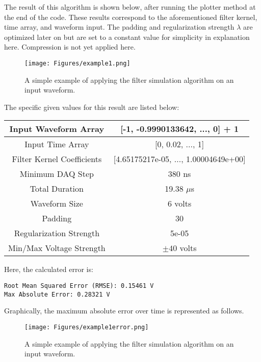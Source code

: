 \documentclass[11pt, a4paper]{article}
\theoremstyle{definition}
\numberwithin{equation}{section}
\begin{document}
The result of this algorithm is shown below, after running the plotter method at the end of the code. These results correspond to the aforementioned filter kernel, time array, and waveform input. The padding and regularization strength $\lambda$ are optimized later on but are set to a constant value for simplicity in explanation here. Compression is not yet applied here.

\begin{figure}[h!]
    \centering
\texttt{[image: Figures/example1.png]}
    \caption{A simple example of applying the filter simulation algorithm on an input waveform.}
\end{figure} \label{example1}

The specific given values for this result are listed below:

\begin{center}
\begin{tabular}{ | c | c | } 
  \hline
   Input Waveform Array & [-1, -0.9990133642, ..., 0] + 1 \\ 
  \hline
  Input Time Array & [0, 0.02, ..., 1] \\ 
  \hline
  Filter Kernel Coefficients & [4.65175217e-05, ..., 1.00004649e+00] \\ 
  \hline
  Minimum DAQ Step & 380 ns \\ 
  \hline
  Total Duration & 19.38 $\mu$s \\ 
  \hline
  Waveform Size & 6 volts \\ 
  \hline
  Padding & 30 \\ 
  \hline
  Regularization Strength & 5e-05 \\ 
  \hline
  Min/Max Voltage Strength & $\pm 40$ volts \\ 
  \hline
\end{tabular}
\end{center}

Here, the calculated error is:

\begin{verbatim}
Root Mean Squared Error (RMSE): 0.15461 V
Max Absolute Error: 0.28321 V
\end{verbatim}

Graphically, the maximum absolute error over time is represented as follows.

\begin{figure}[h!]
    \centering
\texttt{[image: Figures/example1error.png]}
    \caption{A simple example of applying the filter simulation algorithm on an input waveform.}
\end{figure} \label{example1error}
\end{document}
